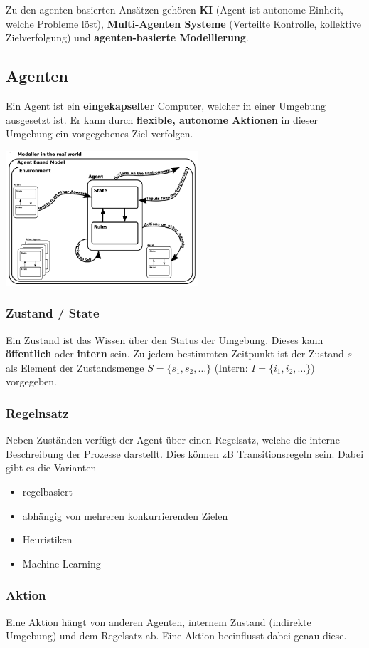 \documentclass[a4paper]{article}
\begin{document}
Zu den agenten-basierten Ansätzen gehören \textbf{KI} (Agent ist autonome Einheit, welche Probleme löst), \textbf{Multi-Agenten Systeme} (Verteilte Kontrolle, kollektive Zielverfolgung) und \textbf{agenten-basierte Modellierung}. 

\subsection{Agenten}
Ein Agent ist ein \textbf{eingekapselter} Computer, welcher in einer Umgebung ausgesetzt ist. Er kann durch \textbf{flexible, autonome Aktionen} in dieser Umgebung ein vorgegebenes Ziel verfolgen.
\begin{center}
	\includegraphics[height = 5cm]{Agent.png}
\end{center}
\subsubsection{Zustand / State}
Ein Zustand ist das Wissen über den Status der Umgebung. Dieses kann \textbf{öffentlich} oder \textbf{intern} sein. Zu jedem bestimmten Zeitpunkt ist der Zustand $s$ als Element der Zustandsmenge $S=\{s_1,s_2,\dots \}$ (Intern: $I=\{i_1,i_2,\dots \}$) vorgegeben.
\subsubsection{Regelnsatz}
Neben Zuständen verfügt der Agent über einen Regelsatz, welche die interne Beschreibung der Prozesse darstellt. Dies können zB  Transitionsregeln sein. Dabei gibt es die Varianten
\begin{itemize}
	\item regelbasiert
	\item abhängig von mehreren konkurrierenden Zielen
	\item Heuristiken
	\item Machine Learning
\end{itemize} 
\subsubsection{Aktion}
Eine Aktion hängt von anderen Agenten, internem Zustand (indirekte Umgebung) und dem Regelsatz ab. Eine Aktion beeinflusst dabei genau diese.
\end{document}
